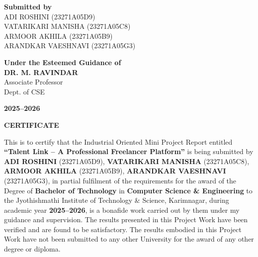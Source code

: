 \documentclass[12pt,a4paper,oneside]{report}
\numberwithin{figure}{chapter}
\numberwithin{table}{chapter}
\begin{document}
\begin{titlepage}
  \begin{minipage}[t]{0.45\textwidth}
    \centering
    {\fontsize{12}{16}\selectfont\bfseries Submitted by}\\[0.4cm]
    {\fontsize{12}{16}\selectfont
      ADI ROSHINI \hfill (23271A05D9)\\[0.2cm]
      VATARIKARI MANISHA \hfill (23271A05C8)\\[0.2cm]
      ARMOOR AKHILA \hfill (23271A05B9)\\[0.2cm]
      ARANDKAR VAESHNAVI \hfill (23271A05G3)}
  \end{minipage}
  \hfill
  \begin{minipage}[t]{0.45\textwidth}
    \centering
    {\fontsize{12}{16}\selectfont\bfseries Under the Esteemed Guidance of}\\[0.4cm]
    {\fontsize{12}{16}\selectfont
      \textbf{DR. M. RAVINDAR}\\
      Associate Professor\\
      Dept. of CSE}
  \end{minipage}

  \vfill
  {\fontsize{12}{16}\selectfont\bfseries 2025--2026}
\end{titlepage}

\thispagestyle{empty}
\newpage
\begin{center}
  {\fontsize{16}{20}\selectfont\bfseries CERTIFICATE}
\end{center}
\vspace{2\baselineskip}

\begin{doublespace}
{\fontsize{12}{16}\selectfont
This is to certify that the Industrial Oriented Mini Project Report entitled
\textbf{``Talent Link -- A Professional Freelancer Platform''} is being submitted by
\textbf{ADI ROSHINI} (23271A05D9), \textbf{VATARIKARI MANISHA} (23271A05C8),
\textbf{ARMOOR AKHILA} (23271A05B9), \textbf{ARANDKAR VAESHNAVI} (23271A05G3),
in partial fulfilment of the requirements for the award of the Degree of
\textbf{Bachelor of Technology} in \textbf{Computer Science \& Engineering} to the
Jyothishmathi Institute of Technology \& Science, Karimnagar, during academic year
\textbf{2025--2026}, is a bonafide work carried out by them under my guidance and
supervision. The results presented in this Project Work have been verified and are
found to be satisfactory. The results embodied in this Project Work have not been
submitted to any other University for the award of any other degree or diploma.
}
\end{doublespace}
\end{document}

